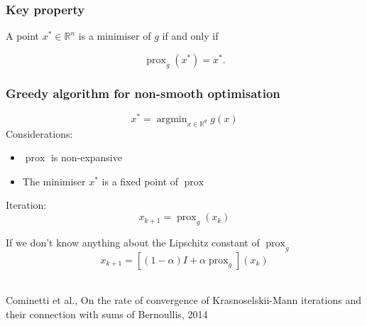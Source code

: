 \documentclass[aspectratio=169]{beamer}
\DeclareMathOperator{\Prox}{prox}
\newcommand{\prox}[2]{\Prox_{#1}\left({#2}\right)}
\newcommand{\RR}{\mathbb{R}}
\newcommand{\rd}{\mathbb{R}^d}
\newcommand{\normtwosq}[1]{\left\|#1\right\|_2^2}
\DeclareMathOperator*{\argmin}{argmin}
\begin{document}
		
		\begin{frame}
		\frametitle{Key property}
		\begin{center}
		A point $x^*\in \RR^n$ is a minimiser of $g$ if and only if 
		\end{center}
		\begin{equation}
		\nonumber \prox{g}{x^*} = x^*.
		\end{equation}
		\end{frame}
		
		\begin{frame}
		\frametitle{Greedy algorithm for non-smooth optimisation}
		\begin{equation}
		\nonumber x^* = \argmin_{x\in \rd} g(x)
		\end{equation}
		\pause
		Considerations:
		\begin{itemize}
		\pause\item $\Prox$ is non-expansive
		\pause\item The minimiser $x^*$ is a fixed point of $\Prox$
		\end{itemize}
		\pause
		Iteration:
		\begin{equation}\nonumber
		x_{k+1} = \prox{g}{x_k}
		\end{equation}
		
		\pause
		If we don't know anything about the Lipschitz constant of $\Prox_g$
		\begin{equation}
		\nonumber x_{k+1} = [(1-\alpha)I + \alpha\Prox_g](x_k)
		\end{equation}
		\quad \\
		\begin{center}
		\textcolor{ExecusharesGrey}{\tiny Cominetti et al., On the rate of convergence of Krasnoselskii-Mann iterations and their connection with sums of Bernoullis, 2014}
		\end{center}
		\end{frame}
		
		
\end{document}
